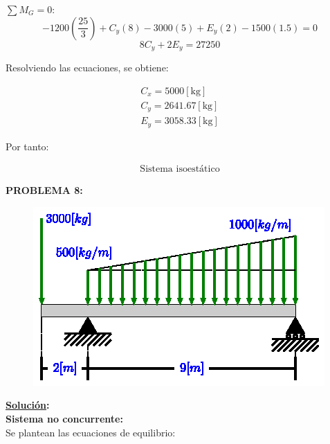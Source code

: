 \documentclass[letter,10pt,twoside]{article}
\begin{document}
$\sum{M_G} = 0$:
\begin{equation*}
    -1200(\frac{25}{3}) + C_y(8) - 3000(5) + E_y(2) -1500(1.5) = 0
\end{equation*}
\begin{equation*}
    8 C_y + 2 E_y = 27250
\end{equation*}

Resolviendo las ecuaciones, se obtiene:

\begin{equation*}
\boxed{
    \begin{array}{l}
        C_x = 5000[\text{kg}] \\
        C_y = 2641.67[\text{kg}] \\
        E_y = 3058.33[\text{kg}]
    \end{array}
}
\end{equation*}

Por tanto:

\begin{equation*}
\boxed{
    \begin{array}{l}
        \text{Sistema isoestático}
    \end{array}
}
\end{equation*}

\vspace{1.0cm}

\colorbox{blue!25}{\textbf{PROBLEMA 8:}}

\begin{figure}[H]
\centering
\includegraphics[scale=1.8]{resources/f08.eps}
\end{figure}

\textbf{\underline{Solución}:} \\

\textbf{Sistema no concurrente:} \\
Se plantean las ecuaciones de equilibrio:
\end{document}
